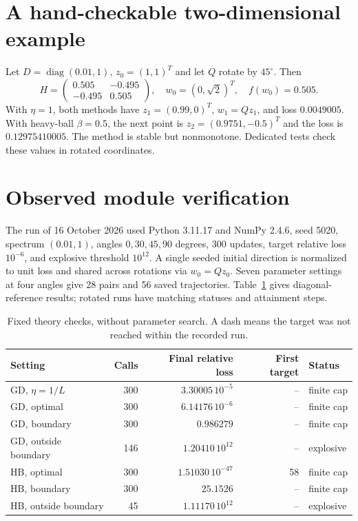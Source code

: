 \documentclass[11pt,a4paper]{article}
\begin{document}
\section{A hand-checkable two-dimensional example}
Let $D=\operatorname{diag}(0.01,1)$, $z_0=(1,1)^T$ and let $Q$ rotate by
$45^\circ$. Then
\[
 H=\begin{pmatrix}0.505&-0.495\\-0.495&0.505\end{pmatrix},\quad
 w_0=(0,\sqrt2)^T,\quad f(w_0)=0.505.
\]
With $\eta=1$, both methods have $z_1=(0.99,0)^T$, $w_1=Qz_1$, and loss
$0.0049005$. With heavy-ball $\beta=0.5$, the next point is
$z_2=(0.9751,-0.5)^T$ and the loss is $0.12975410005$. The method is stable
but nonmonotone. Dedicated tests check these values in rotated coordinates.

\section{Observed module verification}
The run of 16 October 2026 used Python 3.11.17 and NumPy 2.4.6, seed 5020,
spectrum $(0.01,1)$, angles $0,30,45,90$ degrees, 300 updates, target relative
loss $10^{-6}$, and explosive threshold $10^{12}$. A single seeded initial
direction is normalized to unit loss and shared across rotations via $w_0=Qz_0$.
Seven parameter settings at four angles give 28 pairs and 56 saved trajectories.
Table~\ref{tab:results} gives diagonal-reference results; rotated runs have
matching statuses and attainment steps.

\begin{table}[htbp]
\centering
\caption{Fixed theory checks, without parameter search. A dash means the
target was not reached within the recorded run.}
\label{tab:results}
\small
\begin{tabular}{lrrrl}
\toprule
Setting & Calls & Final relative loss & First target & Status\\
\midrule
GD, $\eta=1/L$ & 300 & $3.30005\,10^{-5}$ & -- & finite cap\\
GD, optimal & 300 & $6.14176\,10^{-6}$ & -- & finite cap\\
GD, boundary & 300 & $0.986279$ & -- & finite cap\\
GD, outside boundary & 146 & $1.20410\,10^{12}$ & -- & explosive\\
HB, optimal & 300 & $1.51030\,10^{-47}$ & 58 & finite cap\\
HB, boundary & 300 & $25.1526$ & -- & finite cap\\
HB, outside boundary & 45 & $1.11170\,10^{12}$ & -- & explosive\\
\bottomrule
\end{tabular}
\end{table}
\end{document}
